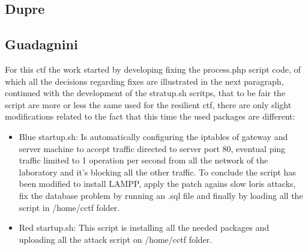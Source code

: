 \documentclass[14pt]{article}
\begin{document}
\subsection{Dupre}

\subsection{Guadagnini}
For this ctf the work started by developing fixing the process.php script code, of which all the decisions regarding fixes are illustrated in the next paragraph, continued with the development of the stratup.sh scritps, that to be fair the script are more or less the same used for the resilient ctf, there are only slight modifications related to the fact that this time the used packages are different:
\begin{itemize}
	\item Blue startup.sh: Is automatically configuring the iptables of gateway and server machine to accept traffic directed to server port 80, eventual ping traffic limited to 1 operation per second from all the network of the laboratory and it's blocking all the other traffic. To conclude the script has been modified to install LAMPP, apply the patch agains slow loris attacks, fix the database problem by running an .sql file and finally by loading all the script in /home/cctf folder.
	
	\item Red startup.sh: This script is installing all the needed packages and uploading all the attack script on /home/cctf folder.
\end{itemize} 
\end{document}
